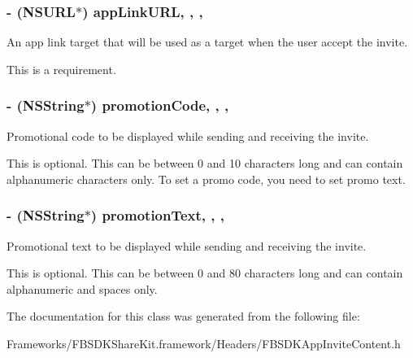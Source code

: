 \subsubsection[{app\+Link\+U\+R\+L}]{\setlength{\rightskip}{0pt plus 5cm}-\/ (N\+S\+U\+R\+L$\ast$) app\+Link\+U\+R\+L\hspace{0.3cm}{\ttfamily [read]}, {\ttfamily [write]}, {\ttfamily [nonatomic]}, {\ttfamily [copy]}}\label{interface_f_b_s_d_k_app_invite_content_adfea27af374a17dc3a0565f9d4f7cda8}
An app link target that will be used as a target when the user accept the invite.

This is a requirement. \hypertarget{interface_f_b_s_d_k_app_invite_content_a81a509cf0b3a9a67bd7a8bb097e010a9}{}
\subsubsection[{promotion\+Code}]{\setlength{\rightskip}{0pt plus 5cm}-\/ (N\+S\+String$\ast$) promotion\+Code\hspace{0.3cm}{\ttfamily [read]}, {\ttfamily [write]}, {\ttfamily [nonatomic]}, {\ttfamily [copy]}}\label{interface_f_b_s_d_k_app_invite_content_a81a509cf0b3a9a67bd7a8bb097e010a9}
Promotional code to be displayed while sending and receiving the invite.

This is optional. This can be between 0 and 10 characters long and can contain alphanumeric characters only. To set a promo code, you need to set promo text. \hypertarget{interface_f_b_s_d_k_app_invite_content_a39b07d656af61d2f4b5c8c2684b157f9}{}
\subsubsection[{promotion\+Text}]{\setlength{\rightskip}{0pt plus 5cm}-\/ (N\+S\+String$\ast$) promotion\+Text\hspace{0.3cm}{\ttfamily [read]}, {\ttfamily [write]}, {\ttfamily [nonatomic]}, {\ttfamily [copy]}}\label{interface_f_b_s_d_k_app_invite_content_a39b07d656af61d2f4b5c8c2684b157f9}
Promotional text to be displayed while sending and receiving the invite.

This is optional. This can be between 0 and 80 characters long and can contain alphanumeric and spaces only. 

The documentation for this class was generated from the following file\+:\begin{DoxyCompactItemize}
\item 
Frameworks/\+F\+B\+S\+D\+K\+Share\+Kit.\+framework/\+Headers/F\+B\+S\+D\+K\+App\+Invite\+Content.\+h\end{DoxyCompactItemize}
